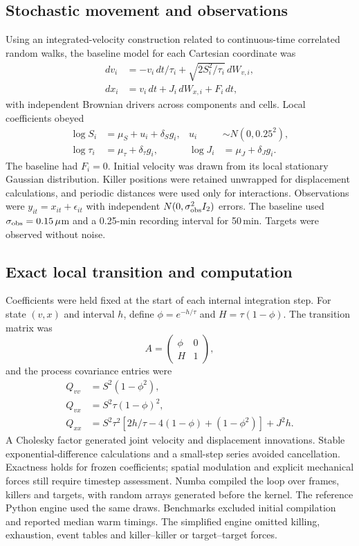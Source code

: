 \documentclass[12pt]{article}
\begin{document}
\subsection*{Stochastic movement and observations}
Using an integrated-velocity construction related to continuous-time correlated random walks\citep{johnson2008}, the baseline model for each Cartesian coordinate was
\begin{align}
 dv_i&=-v_i\,dt/\tau_i+\sqrt{2S_i^2/\tau_i}\,dW_{v,i},\\
 dx_i&=v_i\,dt+J_i\,dW_{x,i}+F_i\,dt,
\end{align}
with independent Brownian drivers across components and cells. Local coefficients obeyed
\begin{align}
 \log S_i&=\mu_S+u_i+\delta_Sg_i,&u_i&\sim N(0,0.25^2),\\
 \log\tau_i&=\mu_\tau+\delta_\tau g_i,&
 \log J_i&=\mu_J+\delta_Jg_i.
\end{align}
The baseline had $F_i=0$. Initial velocity was drawn from its local stationary Gaussian distribution. Killer positions were retained unwrapped for displacement calculations, and periodic distances were used only for interactions. Observations were $y_{it}=x_{it}+\epsilon_{it}$ with independent $N(0,\sigma_{\rm obs}^2I_2)$ errors. The baseline used $\sigma_{\rm obs}=0.15\,\mu$m and a 0.25-min recording interval for 50\,min. Targets were observed without noise.

\subsection*{Exact local transition and computation}
Coefficients were held fixed at the start of each internal integration step. For state $(v,x)$ and interval $h$, define $\phi=e^{-h/\tau}$ and $H=\tau(1-\phi)$. The transition matrix was
\begin{equation}
 A=\begin{pmatrix}\phi&0\\H&1\end{pmatrix},
\end{equation}
and the process covariance entries were
\begin{align}
 Q_{vv}&=S^2(1-\phi^2),\\
 Q_{vx}&=S^2\tau(1-\phi)^2,\\
 Q_{xx}&=S^2\tau^2[2h/\tau-4(1-\phi)+(1-\phi^2)]+J^2h.
\end{align}
A Cholesky factor generated joint velocity and displacement innovations. Stable exponential-difference calculations and a small-step series avoided cancellation. Exactness holds for frozen coefficients; spatial modulation and explicit mechanical forces still require timestep assessment. Numba compiled the loop over frames, killers and targets, with random arrays generated before the kernel. The reference Python engine used the same draws. Benchmarks excluded initial compilation and reported median warm timings. The simplified engine omitted killing, exhaustion, event tables and killer--killer or target--target forces.
\end{document}
